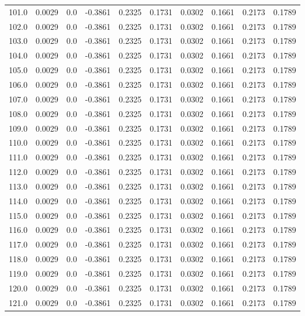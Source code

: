 \begin{longtable}{lrrrrrrrrr}
101.0 & 0.0029 & 0.0 & -0.3861 & 0.2325 & 0.1731 & 0.0302 & 0.1661 & 0.2173 & 0.1789 \\
102.0 & 0.0029 & 0.0 & -0.3861 & 0.2325 & 0.1731 & 0.0302 & 0.1661 & 0.2173 & 0.1789 \\
103.0 & 0.0029 & 0.0 & -0.3861 & 0.2325 & 0.1731 & 0.0302 & 0.1661 & 0.2173 & 0.1789 \\
104.0 & 0.0029 & 0.0 & -0.3861 & 0.2325 & 0.1731 & 0.0302 & 0.1661 & 0.2173 & 0.1789 \\
105.0 & 0.0029 & 0.0 & -0.3861 & 0.2325 & 0.1731 & 0.0302 & 0.1661 & 0.2173 & 0.1789 \\
106.0 & 0.0029 & 0.0 & -0.3861 & 0.2325 & 0.1731 & 0.0302 & 0.1661 & 0.2173 & 0.1789 \\
107.0 & 0.0029 & 0.0 & -0.3861 & 0.2325 & 0.1731 & 0.0302 & 0.1661 & 0.2173 & 0.1789 \\
108.0 & 0.0029 & 0.0 & -0.3861 & 0.2325 & 0.1731 & 0.0302 & 0.1661 & 0.2173 & 0.1789 \\
109.0 & 0.0029 & 0.0 & -0.3861 & 0.2325 & 0.1731 & 0.0302 & 0.1661 & 0.2173 & 0.1789 \\
110.0 & 0.0029 & 0.0 & -0.3861 & 0.2325 & 0.1731 & 0.0302 & 0.1661 & 0.2173 & 0.1789 \\
111.0 & 0.0029 & 0.0 & -0.3861 & 0.2325 & 0.1731 & 0.0302 & 0.1661 & 0.2173 & 0.1789 \\
112.0 & 0.0029 & 0.0 & -0.3861 & 0.2325 & 0.1731 & 0.0302 & 0.1661 & 0.2173 & 0.1789 \\
113.0 & 0.0029 & 0.0 & -0.3861 & 0.2325 & 0.1731 & 0.0302 & 0.1661 & 0.2173 & 0.1789 \\
114.0 & 0.0029 & 0.0 & -0.3861 & 0.2325 & 0.1731 & 0.0302 & 0.1661 & 0.2173 & 0.1789 \\
115.0 & 0.0029 & 0.0 & -0.3861 & 0.2325 & 0.1731 & 0.0302 & 0.1661 & 0.2173 & 0.1789 \\
116.0 & 0.0029 & 0.0 & -0.3861 & 0.2325 & 0.1731 & 0.0302 & 0.1661 & 0.2173 & 0.1789 \\
117.0 & 0.0029 & 0.0 & -0.3861 & 0.2325 & 0.1731 & 0.0302 & 0.1661 & 0.2173 & 0.1789 \\
118.0 & 0.0029 & 0.0 & -0.3861 & 0.2325 & 0.1731 & 0.0302 & 0.1661 & 0.2173 & 0.1789 \\
119.0 & 0.0029 & 0.0 & -0.3861 & 0.2325 & 0.1731 & 0.0302 & 0.1661 & 0.2173 & 0.1789 \\
120.0 & 0.0029 & 0.0 & -0.3861 & 0.2325 & 0.1731 & 0.0302 & 0.1661 & 0.2173 & 0.1789 \\
121.0 & 0.0029 & 0.0 & -0.3861 & 0.2325 & 0.1731 & 0.0302 & 0.1661 & 0.2173 & 0.1789 \\

\end{longtable}

